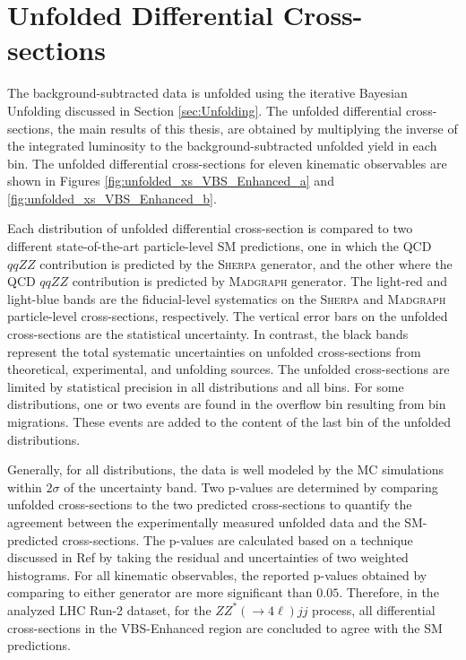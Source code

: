 \section{Unfolded Differential Cross-sections }
\label{sec:DifferentialxS}

The background-subtracted data is unfolded using the iterative Bayesian Unfolding discussed in Section \ref{sec:Unfolding}. The unfolded differential cross-sections, the main results of this thesis, are obtained by multiplying the inverse of the integrated luminosity to the background-subtracted unfolded yield in each bin. The unfolded differential cross-sections for eleven kinematic observables are shown in Figures \ref{fig:unfolded_xs_VBS_Enhanced_a} and \ref{fig:unfolded_xs_VBS_Enhanced_b}. 

Each distribution of unfolded differential cross-section is compared to two different state-of-the-art particle-level SM predictions, one in which the QCD $qqZZ$ contribution is predicted by the \textsc{Sherpa} generator, and the other where the QCD $qqZZ$ contribution is predicted by \textsc{Madgraph} generator. The light-red and light-blue bands are the fiducial-level systematics on the \textsc{Sherpa} and \textsc{Madgraph} particle-level cross-sections, respectively. The vertical error bars on the unfolded cross-sections are the statistical uncertainty. In contrast, the black bands represent the total systematic uncertainties on unfolded cross-sections from theoretical, experimental, and unfolding sources. The unfolded cross-sections are limited by statistical precision in all distributions and all bins. For some distributions, one or two events are found in the overflow bin resulting from bin migrations. These events are added to the content of the last bin of the unfolded distributions. 

Generally, for all distributions, the data is well modeled by the MC simulations within $2\sigma$ of the uncertainty band. Two p-values are determined by comparing unfolded cross-sections to the two predicted cross-sections to quantify the agreement between the experimentally measured unfolded data and the SM-predicted cross-sections. The p-values are calculated based on a technique discussed in Ref\cite{pValueStat} by taking the residual and uncertainties of two weighted histograms. For all kinematic observables, the reported p-values obtained by comparing to either generator are more significant than $0.05$. Therefore, in the analyzed LHC Run-2 dataset, for the $ZZ^*(\rightarrow 4 \ell) jj$ process, all differential cross-sections in the VBS-Enhanced region are concluded to agree with the SM predictions. 

